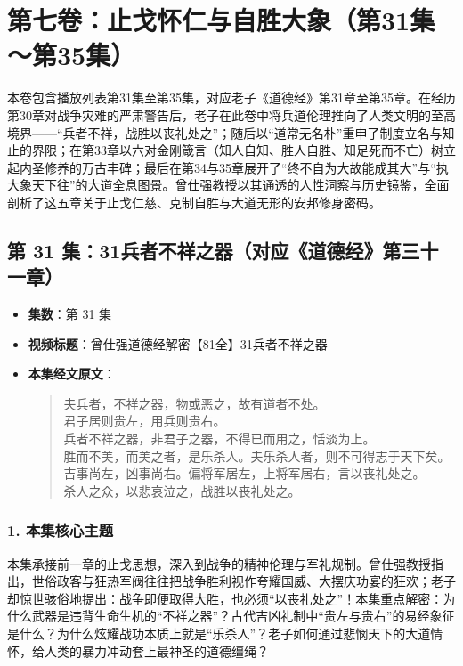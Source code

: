 \section*{第七卷：止戈怀仁与自胜大象（第31集～第35集）}

本卷包含播放列表第31集至第35集，对应老子《道德经》第31章至第35章。在经历第30章对战争灾难的严肃警告后，老子在此卷中将兵道伦理推向了人类文明的至高境界——“兵者不祥，战胜以丧礼处之”；随后以“道常无名朴”重申了制度立名与知止的界限；在第33章以六对金刚箴言（知人自知、胜人自胜、知足死而不亡）树立起内圣修养的万古丰碑；最后在第34与35章展开了“终不自为大故能成其大”与“执大象天下往”的大道全息图景。曾仕强教授以其通透的人性洞察与历史镜鉴，全面剖析了这五章关于止戈仁慈、克制自胜与大道无形的安邦修身密码。

\clearpage

\subsection{第 31 集：31兵者不祥之器（对应《道德经》第三十一章）}
\label{sec:ep31}

\begin{itemize}
    \item \textbf{集数}：第 31 集
    \item \textbf{视频标题}：曾仕强道德经解密【81全】31兵者不祥之器
    
    \item \textbf{本集经文原文}：
    \begin{quote}\kaishu
    夫兵者，不祥之器，物或恶之，故有道者不处。\\
    君子居则贵左，用兵则贵右。\\
    兵者不祥之器，非君子之器，不得已而用之，恬淡为上。\\
    胜而不美，而美之者，是乐杀人。夫乐杀人者，则不可得志于天下矣。\\
    吉事尚左，凶事尚右。偏将军居左，上将军居右，言以丧礼处之。\\
    杀人之众，以悲哀泣之，战胜以丧礼处之。
    \end{quote}
\end{itemize}

\subsubsection{1. 本集核心主题}
本集承接前一章的止戈思想，深入到战争的精神伦理与军礼规制。曾仕强教授指出，世俗政客与狂热军阀往往把战争胜利视作夸耀国威、大摆庆功宴的狂欢；老子却惊世骇俗地提出：战争即便取得大胜，也必须“以丧礼处之”！本集重点解密：为什么武器是违背生命生机的“不祥之器”？古代吉凶礼制中“贵左与贵右”的易经象征是什么？为什么炫耀战功本质上就是“乐杀人”？老子如何通过悲悯天下的大道情怀，给人类的暴力冲动套上最神圣的道德缰绳？


